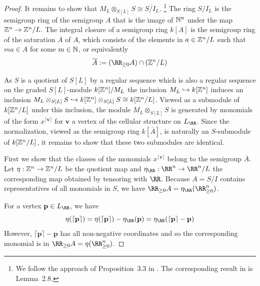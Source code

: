 \documentclass{amsart}
\begin{document}
\begin{proof}
It remains to show that $M_L \otimes_{S[L]} S \cong \overline{S/I_L}$. \footnote{We follow the approach of Proposition~3.3 in \cite{BCS+25}. The corresponding result in \cite{BH25} is Lemma~2.8.}
The ring $S/I_L$ is the semigroup ring of the semigroup $A$ that is the image of $\mathbb N^n$ under the map $\mathbb Z^n \rightarrow \mathbb Z^n/L$. The integral closure of a semigroup ring $k[A]$ is the semigroup ring of the saturation $\overline{A}$ of $A$, which consists of the elements
in $a \in \mathbb Z^n/L$ such that  $ma\in A$ for some $m\in \mathbb N$, or equivalently \cite[***]{Eisenbud1995}
\[\overline{A} := (\RR_{\geq 0}A)\cap (\ZZ^n/L) \]


 As $S$ is a quotient of $S[L]$ by a regular sequence which is also a regular sequence on the graded $S[L]$-module  $k[\mathbb Z^n]/M_L$ the inclusion $M_L\hookrightarrow k[\mathbb Z^n]$ induces an inclusion $M_L\otimes_{S[L]} S \hookrightarrow k[\mathbb Z^n]\otimes_{S[L]} S \cong k[\mathbb Z^n/L]$. Viewed as a submodule of $k[\mathbb Z^n/L]$ under this inclusion, the module $M_L\otimes_{S[L]} S$ is generated by monomials of the form $x^{\lceil \mathbf{v}\rceil}$ for $\mathbf{v}$ a vertex of the cellular structure on $L_{\RR}$. Since the normalization, viewed as the semigroup ring $k[\overline{A}]$, is naturally an $S$-submodule of $k[\mathbb Z^n/L]$, it remains to show that these two submodules are identical.

  First we show that the classes of the monomials $x^{\lceil \mathbf{v}\rceil}$ belong to the semigroup $\overline{A}$.
  Let $\eta:\mathbb Z^n\rightarrow \mathbb Z^n/L$ be the quotient map and $\eta_{\RR}:\RR^n\rightarrow \RR^n/L$ the corresponding map obtained by tensoring with $\RR$. 
  Because $A = S/I$ contains
  representatives of all monomials in $S$, we have $ \RR_{\geq 0} A=\eta_\RR(\RR_{\geq 0}^n)$.
  
  For a vertex $\mathbf{p}\in L_{\RR}$, we have
  \[
  \eta(\lceil \mathbf{p}\rceil) =
  \eta(\lceil \mathbf{p}\rceil)-\eta_{\RR}(\mathbf{p}) =
  \eta_\RR(\lceil \mathbf{p}\rceil - \mathbf{p})
  \]
  However, $\lceil \mathbf{p}\rceil - \mathbf{p}$ has all non-negative coordinates and so the corresponding monomial is in $\RR_{\geq 0} A=\eta(\RR_{\geq 0}^n)$.


\end{proof}
\end{document}
